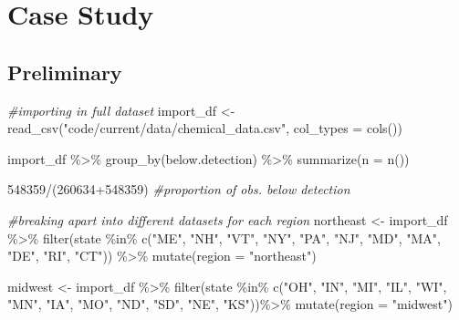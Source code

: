 \documentclass[12pt, twoside]{amherstthesis}
\newenvironment{Shaded}{\begin{snugshade}}{\end{snugshade}}
\newcommand{\AttributeTok}[1]{\textcolor[rgb]{0.77,0.63,0.00}{#1}}
\newcommand{\CommentTok}[1]{\textcolor[rgb]{0.56,0.35,0.01}{\textit{#1}}}
\newcommand{\DecValTok}[1]{\textcolor[rgb]{0.00,0.00,0.81}{#1}}
\newcommand{\FunctionTok}[1]{\textcolor[rgb]{0.00,0.00,0.00}{#1}}
\newcommand{\NormalTok}[1]{#1}
\newcommand{\OtherTok}[1]{\textcolor[rgb]{0.56,0.35,0.01}{#1}}
\newcommand{\SpecialCharTok}[1]{\textcolor[rgb]{0.00,0.00,0.00}{#1}}
\newcommand{\StringTok}[1]{\textcolor[rgb]{0.31,0.60,0.02}{#1}}
\begin{document}
\hypertarget{case-study}{%
\section{Case Study}\label{case-study}}

\hypertarget{preliminary}{%
\subsection{Preliminary}\label{preliminary}}
\begin{Shaded}
\begin{Highlighting}[]
\CommentTok{\#importing in full dataset}
\NormalTok{import\_df }\OtherTok{\textless{}{-}} \FunctionTok{read\_csv}\NormalTok{(}\StringTok{"code/current/data/chemical\_data.csv"}\NormalTok{, }\AttributeTok{col\_types =} \FunctionTok{cols}\NormalTok{())}

\NormalTok{import\_df }\SpecialCharTok{\%\textgreater{}\%}
  \FunctionTok{group\_by}\NormalTok{(below.detection) }\SpecialCharTok{\%\textgreater{}\%}
  \FunctionTok{summarize}\NormalTok{(}\AttributeTok{n =} \FunctionTok{n}\NormalTok{())}

\DecValTok{548359}\SpecialCharTok{/}\NormalTok{(}\DecValTok{260634}\SpecialCharTok{+}\DecValTok{548359}\NormalTok{) }\CommentTok{\#proportion of obs. below detection}

\CommentTok{\#breaking apart into different datasets for each region}
\NormalTok{northeast }\OtherTok{\textless{}{-}}\NormalTok{ import\_df }\SpecialCharTok{\%\textgreater{}\%}
  \FunctionTok{filter}\NormalTok{(state }\SpecialCharTok{\%in\%} \FunctionTok{c}\NormalTok{(}\StringTok{"ME"}\NormalTok{, }\StringTok{"NH"}\NormalTok{, }\StringTok{"VT"}\NormalTok{, }\StringTok{"NY"}\NormalTok{, }\StringTok{"PA"}\NormalTok{, }\StringTok{"NJ"}\NormalTok{, }\StringTok{"MD"}\NormalTok{, }
                      \StringTok{"MA"}\NormalTok{, }\StringTok{"DE"}\NormalTok{, }\StringTok{"RI"}\NormalTok{, }\StringTok{"CT"}\NormalTok{)) }\SpecialCharTok{\%\textgreater{}\%}
  \FunctionTok{mutate}\NormalTok{(}\AttributeTok{region =} \StringTok{"northeast"}\NormalTok{)}

\NormalTok{midwest }\OtherTok{\textless{}{-}}\NormalTok{ import\_df }\SpecialCharTok{\%\textgreater{}\%}
  \FunctionTok{filter}\NormalTok{(state }\SpecialCharTok{\%in\%} \FunctionTok{c}\NormalTok{(}\StringTok{"OH"}\NormalTok{, }\StringTok{"IN"}\NormalTok{, }\StringTok{"MI"}\NormalTok{, }\StringTok{"IL"}\NormalTok{, }\StringTok{"WI"}\NormalTok{, }\StringTok{"MN"}\NormalTok{, }\StringTok{"IA"}\NormalTok{, }
                      \StringTok{"MO"}\NormalTok{, }\StringTok{"ND"}\NormalTok{, }\StringTok{"SD"}\NormalTok{, }\StringTok{"NE"}\NormalTok{, }\StringTok{"KS"}\NormalTok{))}\SpecialCharTok{\%\textgreater{}\%}
  \FunctionTok{mutate}\NormalTok{(}\AttributeTok{region =} \StringTok{"midwest"}\NormalTok{)}


\end{Highlighting}
\end{Shaded}
\end{document}
